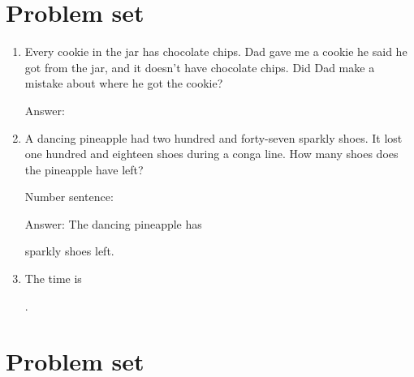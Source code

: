 \documentclass{tufte-book}
\begin{document}
\clearpage\section{Problem set }

\begin{enumerate}

\item Every cookie in the jar has chocolate chips. Dad gave me a cookie he said he got from the jar, and it doesn't have chocolate chips. Did Dad make a mistake about where he got the cookie?\medskip\par
Answer: \dotfill\medskip

\item A dancing pineapple had two hundred and forty-seven sparkly shoes. It lost one hundred and eighteen shoes during a conga line. How many shoes does the pineapple have left?\medskip\par
Number sentence: \dotfill\medskip\par
Answer: The dancing pineapple has 
\dotfill\medskip\par\mbox{}\dotfill\medskip\par\mbox{}\dotfill\bigskip
 sparkly shoes left.

\item {}
The time is \dotfill\medskip\par\dotfill\medskip.

\end{enumerate}

\clearpage\section{Problem set }
\end{document}
